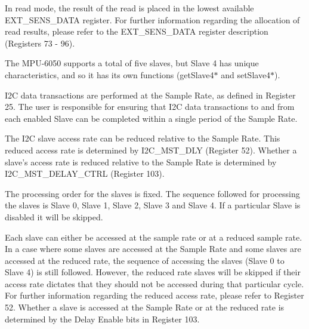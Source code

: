 In read mode, the result of the read is placed in the lowest available E\+X\+T\+\_\+\+S\+E\+N\+S\+\_\+\+D\+A\+T\+A register. For further information regarding the allocation of read results, please refer to the E\+X\+T\+\_\+\+S\+E\+N\+S\+\_\+\+D\+A\+T\+A register description (Registers 73 -\/ 96).

The M\+P\+U-\/6050 supports a total of five slaves, but Slave 4 has unique characteristics, and so it has its own functions (get\+Slave4$\ast$ and set\+Slave4$\ast$).

I2\+C data transactions are performed at the Sample Rate, as defined in Register 25. The user is responsible for ensuring that I2\+C data transactions to and from each enabled Slave can be completed within a single period of the Sample Rate.

The I2\+C slave access rate can be reduced relative to the Sample Rate. This reduced access rate is determined by I2\+C\+\_\+\+M\+S\+T\+\_\+\+D\+L\+Y (Register 52). Whether a slave's access rate is reduced relative to the Sample Rate is determined by I2\+C\+\_\+\+M\+S\+T\+\_\+\+D\+E\+L\+A\+Y\+\_\+\+C\+T\+R\+L (Register 103).

The processing order for the slaves is fixed. The sequence followed for processing the slaves is Slave 0, Slave 1, Slave 2, Slave 3 and Slave 4. If a particular Slave is disabled it will be skipped.

Each slave can either be accessed at the sample rate or at a reduced sample rate. In a case where some slaves are accessed at the Sample Rate and some slaves are accessed at the reduced rate, the sequence of accessing the slaves (Slave 0 to Slave 4) is still followed. However, the reduced rate slaves will be skipped if their access rate dictates that they should not be accessed during that particular cycle. For further information regarding the reduced access rate, please refer to Register 52. Whether a slave is accessed at the Sample Rate or at the reduced rate is determined by the Delay Enable bits in Register 103.


